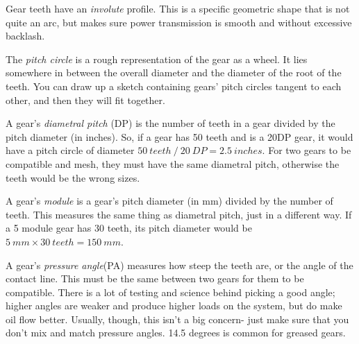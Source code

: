 \begin{asparaenum}[a)]
	\item Gear teeth have an \textit{involute} profile. This is a specific geometric shape that is not quite an arc, but makes sure power transmission is smooth and without excessive backlash.
	\item The \textit{pitch circle} is a rough representation of the gear as a wheel. It lies somewhere in between the overall diameter and the diameter of the root of the teeth. You can draw up a sketch containing gears' pitch circles tangent to each other, and then they will fit together.
	\item A gear's \textit{diametral pitch} (DP) is the number of teeth in a gear divided by the pitch diameter (in inches). So, if a gear has 50 teeth and is a 20DP gear, it would have a pitch circle of diameter $50 \ teeth \ / \ 20 \ DP = 2.5 \ inches$. For two gears to be compatible and mesh, they must have the same diametral pitch, otherwise the teeth would be the wrong sizes.
	\item A gear's \textit{module} is a gear's pitch diameter (in mm) divided by the number of teeth. This measures the same thing as diametral pitch, just in a different way. If a 5 module gear has 30 teeth, its pitch diameter would be $5 \ mm \times 30 \ teeth = 150 \ mm$.
	\item A gear's \textit{pressure angle}(PA) measures how steep the teeth are, or the angle of the contact line. This must be the same between two gears for them to be compatible. There is a lot of testing and science behind picking a good angle; higher angles are weaker and produce higher loads on the system, but do make oil flow better. Usually, though, this isn't a big concern- just make sure that you don't mix and match pressure angles. 14.5 degrees is common for greased gears.
\end{asparaenum}

